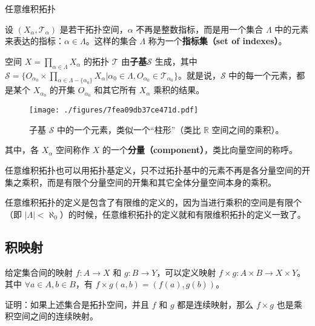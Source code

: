 \begin{definition}{任意维积拓扑}

设 $(X_\alpha, \mathcal{T}_\alpha)$ 是若干拓扑空间，$\alpha$ 不再是整数指标，而是用一个集合 $\Lambda$ 中的元素来表达的指标：$\alpha\in\Lambda$。这样的集合 $\Lambda$ 称为一个\textbf{指标集（set of indexes）}。

空间 $X=\prod\limits_{\alpha\in\Lambda}X_\alpha$ 的拓扑 $\mathcal{T}$ 由\textbf{子基}$\mathcal{S}$ 生成，其中 $\mathcal{S}=\{O_{\alpha_0}\times\prod\limits_{\alpha\in\Lambda-\{\alpha_0\}}X_\alpha|\alpha_0\in\Lambda, O_{\alpha_0}\in\mathcal{T}_{\alpha_0}\}$。就是说，$\mathcal{S}$ 中的每一个元素，都是某个 $X_{\alpha_0}$ 的开集 $O_{\alpha_0}$ 和其它所有 $X_\alpha$ 乘积的结果。

\begin{figure}[ht]
\centering
\texttt{[image: ./figures/7fea09db37ce471d.pdf]}
\caption{子基 $\mathcal{S}$ 中的一个元素，类似一个“柱形”（类比 $\mathbb{R}$ 空间之间的乘积）。} \label{fig_Topo6_1}
\end{figure}

其中，各 $X_\alpha$ 空间称作 $X$ 的一个\textbf{分量（component）}，类比向量空间的称呼。

\end{definition}

任意维积拓扑也可以用拓扑基定义，只不过拓扑基中的元素不再是各分量空间的开集之乘积，而是有限个分量空间的开集和其它全体分量空间本身的乘积。

任意维积拓扑的定义是包含了有限维的定义的，因为当进行乘积的空间是有限个（即 $|\Lambda|<\aleph_0$）的时候，任意维积拓扑的定义就和有限维积拓扑的定义一致了。

\subsection{积映射}

给定集合间的映射 $f:A\rightarrow X$ 和 $g:B\rightarrow Y$，可以定义映射 $f\times g:A\times B\rightarrow X\times Y$。其中 $\forall a\in A, b\in B$，有 $f\times g(a, b)=(f(a), g(b))$。

\begin{exercise}{}\label{exe_Topo6_1}
证明：如果上述集合是拓扑空间，并且 $f$ 和 $g$ 都是连续映射，那么 $f\times g$ 也是乘积空间之间的连续映射。
\end{exercise}



